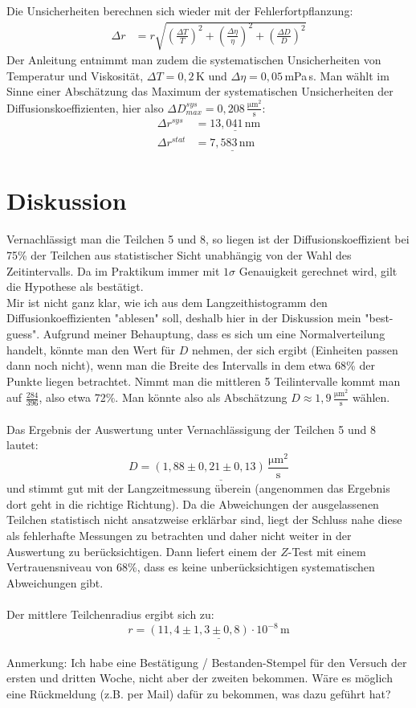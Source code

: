 \documentclass[a4paper,12pt]{article}
\newcommand{\kla}{}
\begin{document}
Die Unsicherheiten berechnen sich wieder mit der Fehlerfortpflanzung:
\begin{align*}
\Delta r&=r\sqrt{\kla\left( {\frac{\Delta T}{T}} \right)^2+\kla\left( {\frac{\Delta \eta}{\eta}} \right)^2+\kla\left( {\frac{\Delta D}{D}} \right)^2}
\end{align*}
Der Anleitung entnimmt man zudem die systematischen Unsicherheiten von Temperatur und Viskosität, $\Delta T=0,2\,$K und $\Delta \eta=0,05\,$mPa\,s. Man wählt im Sinne einer Abschätzung das Maximum der systematischen Unsicherheiten der Diffusionskoeffizienten, hier also $\Delta D^{sys}_{max}=0,208\,\frac{\mathrm{\mu m}^2}{\mathrm{s}}$:
\begin{align*}
\Delta r^{sys}&=\underline{13,041\,\mathrm{nm}}\\
\Delta r^{stat}&=\underline{7,583\,\mathrm{nm}}
\end{align*}
\section{Diskussion}
Vernachlässigt man die Teilchen 5 und 8, so liegen ist der Diffusionskoeffizient bei 75\% der Teilchen aus statistischer Sicht unabhängig von der Wahl des Zeitintervalls. Da im Praktikum immer mit  $1\sigma$ Genauigkeit gerechnet wird, gilt die Hypothese als bestätigt.\\
Mir ist nicht ganz klar, wie ich aus dem Langzeithistogramm den Diffusionkoeffizienten "ablesen" soll, deshalb hier in der Diskussion mein "best-guess". Aufgrund meiner Behauptung, dass es sich um eine Normalverteilung handelt, könnte man den Wert für $D$ nehmen, der sich ergibt (Einheiten passen dann noch nicht), wenn man die Breite des Intervalls in dem etwa 68\% der Punkte liegen betrachtet. Nimmt man die mittleren 5 Teilintervalle kommt man auf $\frac{284}{396}$, also etwa 72\%. Man könnte also als Abschätzung $D\approx 1,9\,\frac{\mathrm{\mu m}^2}{\mathrm{s}}$ wählen. \\ \\
Das Ergebnis der Auswertung unter Vernachlässigung der Teilchen 5 und 8 lautet:
$$D=\underline{\kla\left( {1,88\pm 0,21\pm 0,13} \right)\,\frac{\mathrm{\mu m}^2}{\mathrm{s}}}$$
und stimmt gut mit der Langzeitmessung überein (angenommen das Ergebnis dort geht in die richtige Richtung). Da die Abweichungen der ausgelassenen Teilchen statistisch nicht ansatzweise erklärbar sind, liegt der Schluss nahe diese als fehlerhafte Messungen zu betrachten und daher nicht weiter in der Auswertung zu berücksichtigen. Dann liefert einem der $Z$-Test mit einem Vertrauensniveau von 68\%, dass es keine unberücksichtigen systematischen Abweichungen gibt.\\ \\
Der mittlere Teilchenradius ergibt sich zu:
$$r=\underline{\kla\left( {11,4\pm 1,3\pm 0,8} \right)\cdot 10^{-8}\,\mathrm{m}}$$ \\
Anmerkung: Ich habe eine Bestätigung / Bestanden-Stempel für den Versuch der ersten und dritten Woche, nicht aber der zweiten bekommen. Wäre es möglich eine Rückmeldung (z.B. per Mail) dafür zu bekommen, was dazu geführt hat?
\end{document}
